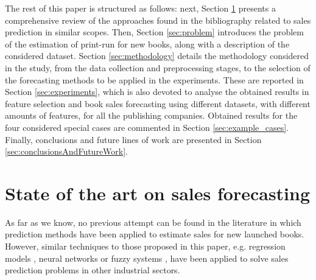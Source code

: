 \documentclass[a4paper,10pt,twocolumn,preprint,3p]{elsarticle}
\begin{document}
The rest of this paper is structured as follows: next, Section \ref{sec:soa} presents a comprehensive review of the approaches found in the bibliography related to sales prediction in similar scopes. 
Then, Section \ref{sec:problem} introduces the problem of the estimation of print-run for new books, along with a description of the considered dataset.
Section \ref{sec:methodology} details the methodology considered in the study, from the data collection and preprocessing stages, to the selection of the forecasting methods to be applied in the experiments.  These are reported in Section \ref{sec:experiments}, which is also devoted to analyse the obtained results in feature selection and book sales forecasting using different datasets, with different amounts of features, for all the publishing companies. Obtained results for the four considered special cases are commented in Section \ref{sec:example_cases}. Finally, conclusions and future lines of work are presented in Section \ref{sec:conclusionsAndFutureWork}. 

\section{State of the art on sales forecasting} 
\label{sec:soa}

As far as we know, no previous attempt can be found in the literature 
in which prediction methods have been applied to estimate sales for new launched books.
However, similar techniques to those proposed in this paper, e.g. 
regression models \cite{Papalexopoulos1990}, 
neural networks \cite{Yoo1999} 
or fuzzy systems \cite{Mastorocostas2001}, 
have been applied to solve sales prediction problems in other industrial sectors.
\end{document}
